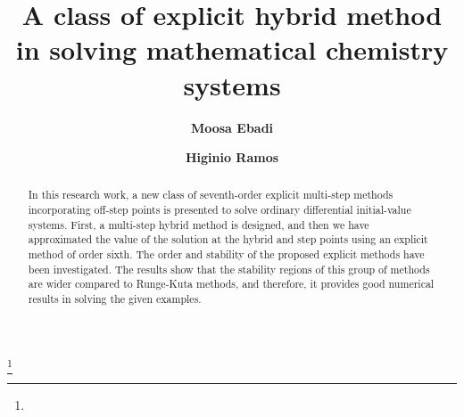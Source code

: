 \documentclass[11pt,twoside, final]{amsart}
\begin{document}
\title[Explicit  Hybrid Method ]{\bf A class of explicit  hybrid method in solving mathematical chemistry systems}
\vspace{.1 cm}
\author[  1 ]{\bf Moosa Ebadi}
\author[  2 ]{\bf  Higinio Ramos }
\address{\small{\hfill\break Department of Mathematics Education,  University of Farhangian, P.O. Box: 14665-889, Tehran, Iran.}\\
\small{\hfill\break
 Scientific Computing Group, Universidad de Salamanca, Plaza de la Merced, 37008 Salamanca, Spain}}
\date{}
\thanks{}
\vspace{1cm}
\vspace{1cm}
\begin{abstract}
 In this research work, a new class of seventh-order explicit multi-step methods  incorporating off-step points is presented  to solve ordinary differential initial-value systems. First, a multi-step hybrid method is designed, and then we have approximated the value of the solution at the hybrid and step points using an explicit method of order sixth. The order and stability of the proposed explicit methods have been investigated. The results show that the stability regions of this group of methods are wider compared to Runge-Kuta methods, and therefore, it provides good numerical results in solving the given examples.
 \end{abstract}
\maketitle {}
\end{document}
